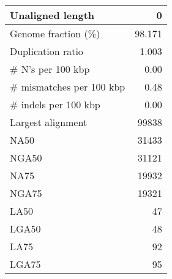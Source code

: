 \documentclass[12pt,a4paper]{article}
\begin{document}
\begin{table}[ht]
\begin{center}
\begin{tabular}{|l*{1}{|r}|}
Unaligned length & 0 \\ \hline
Genome fraction (\%) & 98.171 \\ \hline
Duplication ratio & 1.003 \\ \hline
\# N's per 100 kbp & 0.00 \\ \hline
\# mismatches per 100 kbp & 0.48 \\ \hline
\# indels per 100 kbp & 0.00 \\ \hline
Largest alignment & 99838 \\ \hline
NA50 & 31433 \\ \hline
NGA50 & 31121 \\ \hline
NA75 & 19932 \\ \hline
NGA75 & 19321 \\ \hline
LA50 & 47 \\ \hline
LGA50 & 48 \\ \hline
LA75 & 92 \\ \hline
LGA75 & 95 \\ \hline
\end{tabular}
\end{center}
\end{table}
\end{document}
